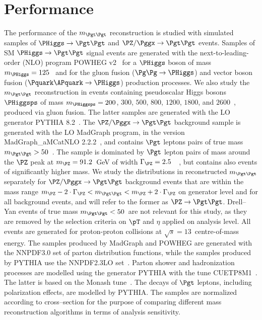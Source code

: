 \section{Performance}
\label{sec:performance}

The performance of the $m_{\Pgt\Pgt}$ reconstruction is studied with
simulated samples of $\PHiggs \to \Pgt\Pgt$ and $\PZ/\Pggx \to \Pgt\Pgt$ events.
Samples of SM $\PHiggs \to \Pgt\Pgt$ signal events
are generated with the next-to-leading-order (NLO) program POWHEG v2~\cite{POWHEG1,POWHEG2,POWHEG3}
for a $\PHiggs$ boson of mass $m_{\PHiggs} = 125$~\GeV 
and for the gluon fusion ($\Pg\Pg \to \PHiggs$) and vector boson fusion ($\Pquark\APquark \to \PHiggs$) production processes.
We also study the $m_{\Pgt\Pgt}$ reconstruction in events containing pseudoscalar Higgs bosons $\PHiggsps$ of mass $m_{\PHiggsps} = 200$, $300$, $500$, $800$, $1200$, $1800$, and $2600$~\GeV,
produced via gluon fusion.
The latter samples are generated with the LO generator PYTHIA 8.2~\cite{pythia8}.
The $\PZ/\Pggx \to \Pgt\Pgt$ background sample is generated with the LO MadGraph program, in the version MadGraph\_aMCatNLO 2.2.2~\cite{MadGraph_aMCatNLO},
and contains $\Pgt$ leptons pairs of true mass $m_{\Pgt\Pgt} > 50$~\GeV.
The sample is dominated by $\Pgt$ lepton pairs of mass around the $\PZ$ peak at $m_{\PZ} = 91.2$~GeV of width $\Gamma_{\PZ} = 2.5$~\GeV~\cite{PDG}, 
but contains also events of significantly higher mass.
We study the distributions in reconstructed $m_{\Pgt\Pgt}$ separately for 
$\PZ/\Pggx \to \Pgt\Pgt$ background events that are within the mass range $m_{\PZ} - 2 \cdot \Gamma_{\PZ} < m_{\Pgt\Pgt} < m_{\PZ} + 2 \cdot \Gamma_{\PZ}$ on generator level
and for all background events,
and will refer to the former as $\PZ \to \Pgt\Pgt$.
Drell--Yan events of true mass $m_{\Pgt\Pgt} < 50$~\GeV are not relevant for this study, 
as they are removed by the selection criteria on $\pT$ and $\eta$ applied on analysis level.
All events are generated for proton-proton collisions at $\sqrt{s} = 13$~\TeV centre-of-mass energy.
The samples produced by MadGraph and POWHEG are generated with the NNPDF3.0 set of parton distribution functions,
while the samples produced by PYTHIA use the NNPDF2.3LO set~\cite{NNPDF1,NNPDF2,NNPDF3}.
Parton shower and hadronization processes are modelled using the generator PYTHIA with the tune CUETP8M1~\cite{PYTHIA_CUETP8M1tune_CMS}.
The latter is based on the Monash tune~\cite{PYTHIA_MonashTune}.
The decays of $\Pgt$ leptons, including polarization effects, are modelled by PYTHIA.
The samples are normalized according to cross--section for the purpose of comparing different mass reconstruction algorithms in terms of analysis sensitivity.
